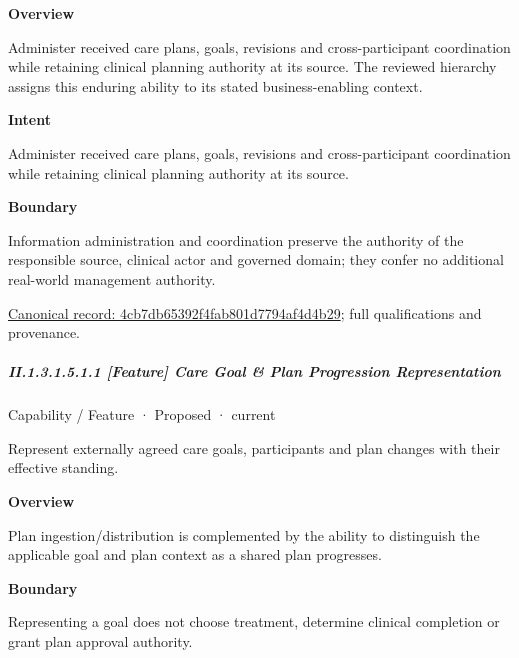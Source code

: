 \textbf{Overview}



Administer received care plans, goals, revisions and cross-participant coordination while retaining clinical planning authority at its source. The reviewed hierarchy assigns this enduring ability to its stated business-enabling context.



\textbf{Intent}



Administer received care plans, goals, revisions and cross-participant coordination while retaining clinical planning authority at its source.



\textbf{Boundary}



Information administration and coordination preserve the authority of the responsible source, clinical actor and governed domain; they confer no additional real-world management authority.


{\footnotesize \href{../../../../continuum/strategy/capability/4cb7db65392f4fab801d7794af4d4b29.md}{Canonical record: 4cb7db65392f4fab801d7794af4d4b29}; full qualifications and provenance.}\par
\subparagraph*{II.1.3.1.5.1.1 [Feature] Care Goal \& Plan Progression Representation}
\label{navigation:II.1.3.1.5.1.1}

\label{element:7332de92e6c14bc8b071cf18f78f9525}
{\small Capability / Feature · Proposed · current}\par

Represent externally agreed care goals, participants and plan changes with their effective standing.



\textbf{Overview}



Plan ingestion/distribution is complemented by the ability to distinguish the applicable goal and plan context as a shared plan progresses.



\textbf{Boundary}



Representing a goal does not choose treatment, determine clinical completion or grant plan approval authority.


